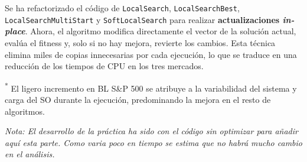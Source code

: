 Se ha refactorizado el código de \texttt{LocalSearch}, \texttt{LocalSearchBest}, \texttt{LocalSearchMultiStart} y \texttt{SoftLocalSearch} para realizar \textbf{actualizaciones \textit{in-place}}.
 Ahora, el algoritmo modifica directamente el vector de la solución actual, evalúa el fitness y, solo si no hay mejora, revierte los cambios. Esta técnica elimina miles de copias innecesarias por cada ejecución, lo que se traduce en una reducción de los tiempos de CPU en los tres mercados.

\begin{table}[H]
\centering
\caption{Comparativa de tiempos: Informe original vs. Versión optimizada (Ubuntu)}
\label{tab:comparativa-tiempos-opt}
\par\smallskip
\footnotesize\textsuperscript{*} El ligero incremento en BL S\&P 500 se atribuye a la variabilidad del sistema y carga del SO durante la ejecución, predominando la mejora en el resto de algoritmos.
\end{table}

\textit{Nota: El desarrollo de la práctica ha sido con el código sin optimizar para añadir aquí esta parte. Como varia poco en tiempo se estima que no habrá mucho cambio en el análisis.}

